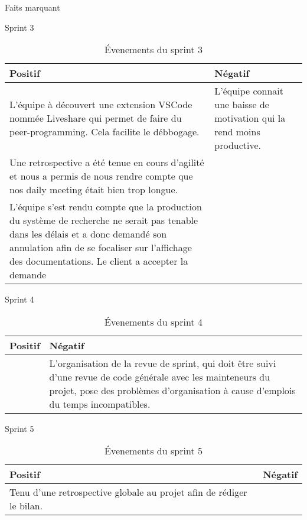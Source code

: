\documentclass[]{article}
\begin{document}
{\begin{section}{Faits marquant}
    \begin{subsection}{Sprint 3}
        \begin{table}[H]
            \caption{Évenements du sprint 3}
            \begin{tabularx}{\columnwidth}{|X|X|}
                \hline
                \cellcolor[HTML]{17FF00}Positif & \cellcolor[HTML]{FF2D00}Négatif\\
                \hline
                L'équipe à découvert une extension VSCode nommée Liveshare qui permet de faire du peer-programming. Cela facilite le débbogage. & L'équipe connait une baisse de motivation qui la rend moins productive. \\
                \hline
                Une retrospective a été tenue en cours d'agilité et nous a permis de nous rendre compte que nos daily meeting était bien trop longue. & \\
                \hline
                L'équipe s'est rendu compte que la production du système de recherche ne serait pas tenable dans les délais et a donc demandé son annulation afin de se focaliser sur l'affichage des documentations. Le client a accepter la demande & \\
                \hline
            \end{tabularx}
        \end{table}
    \end{subsection}

    \begin{subsection}{Sprint 4}
        \begin{table}[H]
            \caption{Évenements du sprint 4}
            \begin{tabularx}{\columnwidth}{|X|X|}
                \hline
                \cellcolor[HTML]{17FF00}Positif & \cellcolor[HTML]{FF2D00}Négatif\\
                \hline
                 & L'organisation de la revue de sprint, qui doit être suivi d'une revue de code générale avec les mainteneurs du projet, pose des problèmes d'organisation à cause d'emplois du temps incompatibles. \\
                \hline
            \end{tabularx}
        \end{table}
    \end{subsection}

    \begin{subsection}{Sprint 5}
        \begin{table}[H]
            \caption{Évenements du sprint 5}
            \begin{tabularx}{\columnwidth}{|X|X|}
                \hline
                \cellcolor[HTML]{17FF00}Positif & \cellcolor[HTML]{FF2D00}Négatif\\
                \hline
                Tenu d'une retrospective globale au projet afin de rédiger le bilan. & \\
                \hline
            \end{tabularx}
        \end{table}
    \end{subsection}


\end{section}}
\end{document}
